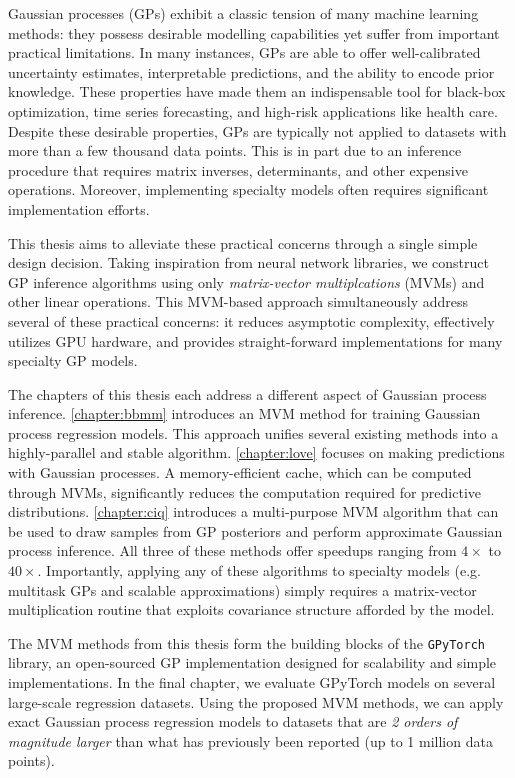 Gaussian processes (GPs) exhibit a classic tension of many machine learning methods:
they possess desirable modelling capabilities yet suffer from important practical limitations.
In many instances, GPs are able to offer well-calibrated uncertainty estimates, interpretable predictions, and the ability to encode prior knowledge.
These properties have made them an indispensable tool for black-box optimization, time series forecasting, and high-risk applications like health care.
Despite these desirable properties, GPs are typically not applied to datasets with more than a few thousand data points.
This is in part due to an inference procedure that requires matrix inverses, determinants, and other expensive operations.
Moreover, implementing specialty models often requires significant implementation efforts.

This thesis aims to alleviate these practical concerns through a single simple design decision.
Taking inspiration from neural network libraries, we construct GP inference algorithms using only \emph{matrix-vector multiplcations} (MVMs) and other linear operations.
This MVM-based approach simultaneously address several of these practical concerns: it reduces asymptotic complexity, effectively utilizes GPU hardware, and provides straight-forward implementations for many specialty GP models.

The chapters of this thesis each address a different aspect of Gaussian process inference.
\cref{chapter:bbmm} introduces an MVM method for training Gaussian process regression models.
This approach unifies several existing methods into a highly-parallel and stable algorithm.
\cref{chapter:love} focuses on making predictions with Gaussian processes.
A memory-efficient cache, which can be computed through MVMs, significantly reduces the computation required for predictive distributions.
\cref{chapter:ciq} introduces a multi-purpose MVM algorithm that can be used to draw samples from GP posteriors and perform approximate Gaussian process inference.
All three of these methods offer speedups ranging from $4\times$ to $40\times$.
Importantly, applying any of these algorithms to specialty models (e.g. multitask GPs and scalable approximations) simply requires a matrix-vector multiplication routine that exploits covariance structure afforded by the model.

The MVM methods from this thesis form the building blocks of the {\tt GPyTorch} library, an open-sourced GP implementation designed for scalability and simple implementations.
In the final chapter, we evaluate GPyTorch models on several large-scale regression datasets.
Using the proposed MVM methods, we can apply exact Gaussian process regression models to datasets that are \emph{2 orders of magnitude larger} than what has previously been reported (up to 1 million data points).
